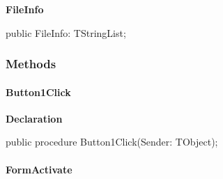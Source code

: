 \documentclass{report}
\newif\ifpdf
\begin{document}
\begin{list}{}
\begin{flushleft}
\ifpdf
\end{flushleft}
\fi


\par  \label{editor.TfrmEditor-FileInfo}
\item[\textbf{FileInfo}\hfill]
\ifpdf
\begin{flushleft}
\fi
\begin{ttfamily}
public FileInfo: TStringList;\end{ttfamily}

\ifpdf
\end{flushleft}
\fi


\par  \end{list}
\subsubsection*{\large{\textbf{Methods}}\normalsize\hspace{1ex}\hfill}
\paragraph*{Button1Click}\hspace*{\fill}

\label{editor.TfrmEditor-Button1Click}
\begin{list}{}{
\setlength{\itemindent}{0cm}
\setlength{\listparindent}{0cm}
\setlength{\leftmargin}{\evensidemargin}
\addtolength{\leftmargin}{\tmplength}
\settowidth{\labelsep}{X}
\addtolength{\leftmargin}{\labelsep}
\setlength{\labelwidth}{\tmplength}
}
\item[\textbf{Declaration}\hfill]
\ifpdf
\begin{flushleft}
\fi
\begin{ttfamily}
public procedure Button1Click(Sender: TObject);\end{ttfamily}

\ifpdf
\end{flushleft}
\fi

\end{list}
\paragraph*{FormActivate}\hspace*{\fill}
\end{document}
